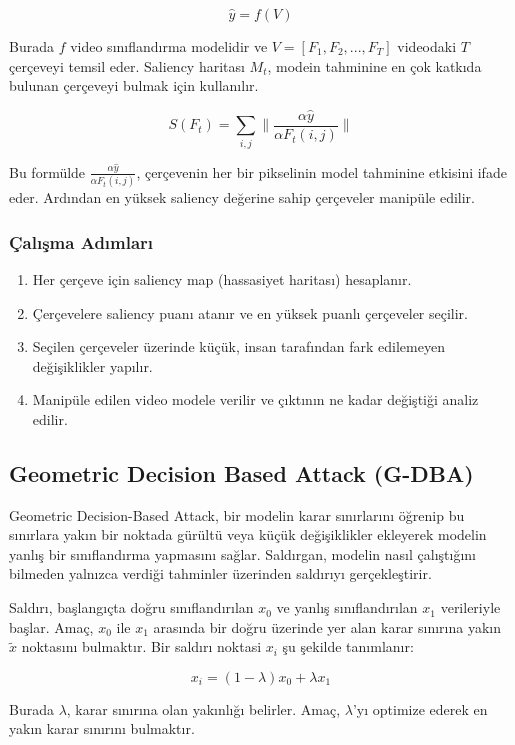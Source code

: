\[ \hat{y} = f(V) \]

Burada $f$ video sınıflandırma modelidir ve $V = [F_1, F_2, ..., F_T]$ videodaki $T$ çerçeveyi temsil eder. Saliency haritası $M_t$, modein tahminine en çok katkıda bulunan çerçeveyi bulmak için kullanılır.

\[ S(F_t) = \sum_{i,j} \| \frac{\alpha \hat{y}}{\alpha F_t(i, j)} \| \]

Bu formülde $\frac{\alpha \hat{y}}{\alpha F_t(i, j)}$, çerçevenin her bir pikselinin model tahminine etkisini ifade eder. Ardından en yüksek saliency değerine sahip çerçeveler manipüle edilir.

\subsubsection{Çalışma Adımları}

\begin{enumerate}
    \item Her çerçeve için saliency map (hassasiyet haritası) hesaplanır. 
    \item Çerçevelere saliency puanı atanır ve en yüksek puanlı çerçeveler seçilir.
    \item Seçilen çerçeveler üzerinde küçük, insan tarafından fark edilemeyen değişiklikler yapılır.
    \item Manipüle edilen video modele verilir ve çıktının ne kadar değiştiği analiz edilir.
\end{enumerate}

\newpage

\subsection{Geometric Decision Based Attack (G-DBA)}

Geometric Decision-Based Attack, bir modelin karar sınırlarını öğrenip bu sınırlara yakın bir noktada gürültü veya küçük değişiklikler ekleyerek modelin yanlış bir sınıflandırma yapmasını sağlar. Saldırgan, modelin nasıl çalıştığını bilmeden yalnızca verdiği tahminler üzerinden saldırıyı gerçekleştirir.

Saldırı, başlangıçta doğru sınıflandırılan $x_0$ ve yanlış sınıflandırılan $x_1$ verileriyle başlar. Amaç, $x_0$ ile $x_1$ arasında bir doğru üzerinde yer alan karar sınırına yakın $\tilde{x}$ noktasını bulmaktır. Bir saldırı noktasi $x_i$ şu şekilde tanımlanır:

\[ x_i  = (1 - \lambda) x_0 + \lambda x_1 \]

Burada $\lambda$, karar sınırına olan yakınlığı belirler. Amaç, $\lambda$'yı optimize ederek en yakın karar sınırını bulmaktır.

